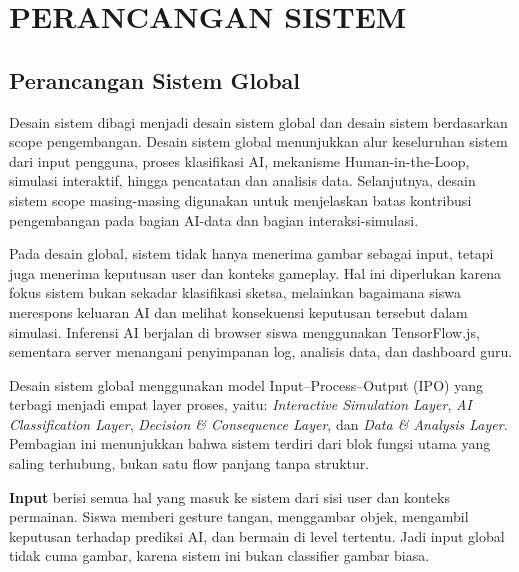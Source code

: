 
\chapter{PERANCANGAN SISTEM}

\section{Perancangan Sistem Global}

Desain sistem dibagi menjadi desain sistem global dan desain sistem berdasarkan scope pengembangan. Desain sistem global menunjukkan alur keseluruhan sistem dari input pengguna, proses klasifikasi AI, mekanisme Human-in-the-Loop, simulasi interaktif, hingga pencatatan dan analisis data. Selanjutnya, desain sistem scope masing-masing digunakan untuk menjelaskan batas kontribusi pengembangan pada bagian AI-data dan bagian interaksi-simulasi.

Pada desain global, sistem tidak hanya menerima gambar sebagai input, tetapi juga menerima keputusan user dan konteks gameplay. Hal ini diperlukan karena fokus sistem bukan sekadar klasifikasi sketsa, melainkan bagaimana siswa merespons keluaran AI dan melihat konsekuensi keputusan tersebut dalam simulasi. Inferensi AI berjalan di browser siswa menggunakan TensorFlow.js, sementara server menangani penyimpanan log, analisis data, dan dashboard guru.

Desain sistem global menggunakan model Input--Process--Output (IPO) yang terbagi menjadi empat layer proses, yaitu: \textit{Interactive Simulation Layer}, \textit{AI Classification Layer}, \textit{Decision \& Consequence Layer}, dan \textit{Data \& Analysis Layer}. Pembagian ini menunjukkan bahwa sistem terdiri dari blok fungsi utama yang saling terhubung, bukan satu flow panjang tanpa struktur.

\textbf{Input} berisi semua hal yang masuk ke sistem dari sisi user dan konteks permainan. Siswa memberi gesture tangan, menggambar objek, mengambil keputusan terhadap prediksi AI, dan bermain di level tertentu. Jadi input global tidak cuma gambar, karena sistem ini bukan classifier gambar biasa.

